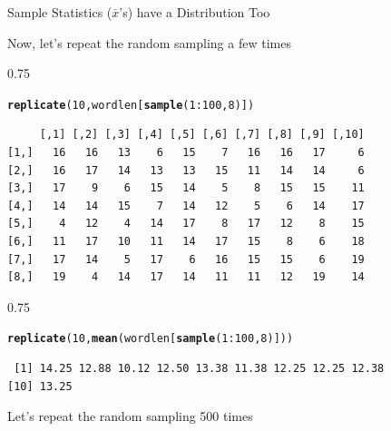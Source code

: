 \documentclass{beamer}\usepackage[]{graphicx}\usepackage[]{color}
\makeatletter
\newcommand{\hlnum}[1]{\textcolor[rgb]{0.2,0.2,0.2}{#1}}%
\newcommand{\hlopt}[1]{\textcolor[rgb]{0.102,0.102,0.102}{#1}}%
\newcommand{\hlstd}[1]{\textcolor[rgb]{0.102,0.102,0.102}{#1}}%
\newcommand{\hlkwd}[1]{\textcolor[rgb]{0.102,0.102,0.102}{\textbf{#1}}}%
\newenvironment{kframe}{%
 \def\at@end@of@kframe{}%
 \ifinner\ifhmode%
  \def\at@end@of@kframe{\end{minipage}}%
  \begin{minipage}{\columnwidth}%
 \fi\fi%
 \def\FrameCommand##1{\hskip\@totalleftmargin \hskip-\fboxsep
 \colorbox{shadecolor}{##1}\hskip-\fboxsep
     \hskip-\linewidth \hskip-\@totalleftmargin \hskip\columnwidth}%
 \MakeFramed {\advance\hsize-\width
   \@totalleftmargin\z@ \linewidth\hsize
   \@setminipage}}%
 {\par\unskip\endMakeFramed%
 \at@end@of@kframe}
\newenvironment{knitrout}{}{} %
\renewenvironment{knitrout}{\begin{spacing}{0.75}\begin{tiny}}{\end{tiny}\end{spacing}}
\newcommand{\xbar}{\overline{x}}
\makeatother
\begin{document}
\begin{frame}{Sample Statistics ($\xbar$'s) have a Distribution Too\;\;}
\newpage

Now, let's repeat the random sampling a few times

\begin{knitrout}\small
{}\color{fgcolor}\begin{kframe}
\begin{alltt}
\hlkwd{replicate}\hlstd{(}\hlnum{10}\hlstd{, wordlen[}\hlkwd{sample}\hlstd{(}\hlnum{1}\hlopt{:}\hlnum{100}\hlstd{,}\hlnum{8}\hlstd{)] )}
\end{alltt}
\begin{verbatim}
     [,1] [,2] [,3] [,4] [,5] [,6] [,7] [,8] [,9] [,10]
[1,]   16   16   13    6   15    7   16   16   17     6
[2,]   16   17   14   13   13   15   11   14   14     6
[3,]   17    9    6   15   14    5    8   15   15    11
[4,]   14   14   15    7   14   12    5    6   14    17
[5,]    4   12    4   14   17    8   17   12    8    15
[6,]   11   17   10   11   14   17   15    8    6    18
[7,]   17   14    5   17    6   16   15   15    6    19
[8,]   19    4   14   17   14   11   11   12   19    14
\end{verbatim}
\end{kframe}
\end{knitrout}

\begin{knitrout}\small
{}\color{fgcolor}\begin{kframe}
\begin{alltt}
\hlkwd{replicate}\hlstd{(}\hlnum{10}\hlstd{,} \hlkwd{mean}\hlstd{(wordlen[}\hlkwd{sample}\hlstd{(}\hlnum{1}\hlopt{:}\hlnum{100}\hlstd{,}\hlnum{8}\hlstd{)]) )}
\end{alltt}
\begin{verbatim}
 [1] 14.25 12.88 10.12 12.50 13.38 11.38 12.25 12.25 12.38
[10] 13.25
\end{verbatim}
\end{kframe}
\end{knitrout}

\newpage

Let's repeat the random sampling 500 times


\end{frame}
\end{document}
